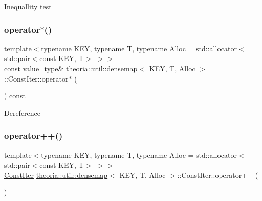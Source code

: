 Inequallity test \mbox{\label{classtheoria_1_1util_1_1densemap_1_1ConstIter_ae0b3f11bfbeb4ef1335da2eb021d1de8}} 
\subsubsection{\texorpdfstring{operator$\ast$()}{operator*()}}
{\footnotesize\ttfamily template$<$typename K\+EY, typename T, typename Alloc = std\+::allocator$<$std\+::pair$<$const K\+E\+Y, T$>$ $>$$>$ \\
const \hyperlink{classtheoria_1_1util_1_1densemap_1_1ConstIter_a061fb76ecf5498d6033472fa66635d4a}{value\+\_\+type}\& \hyperlink{classtheoria_1_1util_1_1densemap}{theoria\+::util\+::densemap}$<$ K\+EY, T, Alloc $>$\+::Const\+Iter\+::operator$\ast$ (\begin{DoxyParamCaption}{ }\end{DoxyParamCaption}) const\hspace{0.3cm}{\ttfamily [inline]}}

Dereference \mbox{\label{classtheoria_1_1util_1_1densemap_1_1ConstIter_a7dba18b534ffdf71354b4b5789aea3a1}} 
\subsubsection{\texorpdfstring{operator++()}{operator++()}\hspace{0.1cm}{\footnotesize\ttfamily [1/2]}}
{\footnotesize\ttfamily template$<$typename K\+EY, typename T, typename Alloc = std\+::allocator$<$std\+::pair$<$const K\+E\+Y, T$>$ $>$$>$ \\
\hyperlink{classtheoria_1_1util_1_1densemap_1_1ConstIter}{Const\+Iter} \hyperlink{classtheoria_1_1util_1_1densemap}{theoria\+::util\+::densemap}$<$ K\+EY, T, Alloc $>$\+::Const\+Iter\+::operator++ (\begin{DoxyParamCaption}{ }\end{DoxyParamCaption})\hspace{0.3cm}{\ttfamily [inline]}}

